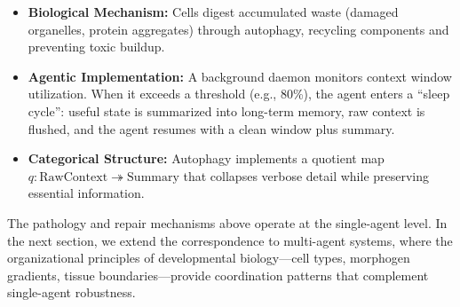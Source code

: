\begin{itemize}[leftmargin=*]
\item \textbf{Biological Mechanism:} Cells digest accumulated waste (damaged organelles, protein
aggregates) through autophagy, recycling components and preventing toxic buildup.
\item \textbf{Agentic Implementation:} A background daemon monitors context window utilization.
When it exceeds a threshold (e.g., 80\%), the agent enters a ``sleep cycle'': useful state is
summarized into long-term memory, raw context is flushed, and the agent resumes with a clean
window plus summary.
\item \textbf{Categorical Structure:} Autophagy implements a quotient map
$q: \text{RawContext} \twoheadrightarrow \text{Summary}$ that collapses verbose detail while
preserving essential information.
\end{itemize}

The pathology and repair mechanisms above operate at the single-agent level. In the next section, we extend the correspondence to multi-agent systems, where the organizational principles of developmental biology---cell types, morphogen gradients, tissue boundaries---provide coordination patterns that complement single-agent robustness.
